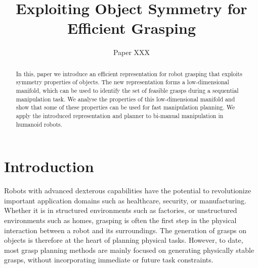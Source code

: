 \documentclass{aamas2015}
\begin{document}
\title{Exploiting Object Symmetry for Efficient Grasping}

\author{
\alignauthor
Paper XXX
}

\newcommand{\vech}[1]{\textbf{#1}}
\newcommand{\set}[1]{\textbf{#1}}

\maketitle


\begin{abstract}
In this, paper we introduce an efficient representation for robot grasping that exploits symmetry
properties of objects. The new representation forms a low-dimensional manifold, which can be used to
identify the set of feasible grasps during a sequential manipulation task. We analyse the properties
of this low-dimensional manifold and show that some of these properties can be used for fast
manipulation planning. We apply the introduced representation and planner to bi-manual manipulation
in humanoid robots.
\end{abstract}

\section{Introduction}

Robots with advanced dexterous capabilities have the potential to revolutionize important
application domains such as healthcare, security, or manufacturing. Whether it is in structured
environments such as factories, or unstructured environments such as homes, grasping is often the
first step in the physical interaction between a robot and its surroundings. The generation of
grasps on objects is therefore at the heart of planning physical tasks. However, to date, most grasp
planning methods are mainly focused on generating physically stable grasps, without incorporating
immediate or future task constraints. 
\end{document}
